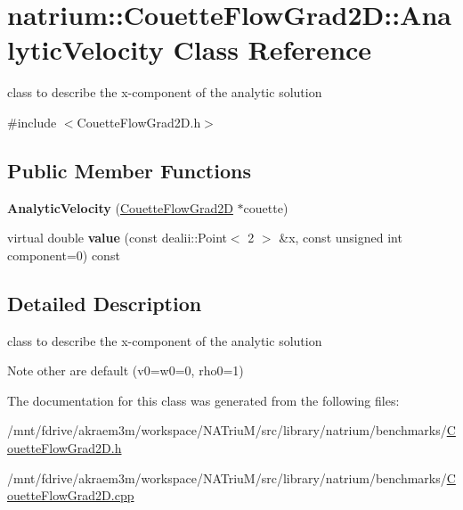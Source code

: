 \hypertarget{classnatrium_1_1CouetteFlowGrad2D_1_1AnalyticVelocity}{
\section{natrium::CouetteFlowGrad2D::AnalyticVelocity Class Reference}
\label{classnatrium_1_1CouetteFlowGrad2D_1_1AnalyticVelocity}
}


class to describe the x-\/component of the analytic solution  


{\ttfamily \#include $<$CouetteFlowGrad2D.h$>$}\subsection*{Public Member Functions}
\begin{DoxyCompactItemize}
\item 
\hypertarget{classnatrium_1_1CouetteFlowGrad2D_1_1AnalyticVelocity_a0000c1ae561e0cb83908149458239bc9}{
{\bfseries AnalyticVelocity} (\hyperlink{classnatrium_1_1CouetteFlowGrad2D}{CouetteFlowGrad2D} $\ast$couette)}
\label{classnatrium_1_1CouetteFlowGrad2D_1_1AnalyticVelocity_a0000c1ae561e0cb83908149458239bc9}

\item 
\hypertarget{classnatrium_1_1CouetteFlowGrad2D_1_1AnalyticVelocity_ae275beccc815763b2b998f474a7331da}{
virtual double {\bfseries value} (const dealii::Point$<$ 2 $>$ \&x, const unsigned int component=0) const }
\label{classnatrium_1_1CouetteFlowGrad2D_1_1AnalyticVelocity_ae275beccc815763b2b998f474a7331da}

\end{DoxyCompactItemize}


\subsection{Detailed Description}
class to describe the x-\/component of the analytic solution \begin{DoxyNote}{Note}
other are default (v0=w0=0, rho0=1) 
\end{DoxyNote}


The documentation for this class was generated from the following files:\begin{DoxyCompactItemize}
\item 
/mnt/fdrive/akraem3m/workspace/NATriuM/src/library/natrium/benchmarks/\hyperlink{CouetteFlowGrad2D_8h}{CouetteFlowGrad2D.h}\item 
/mnt/fdrive/akraem3m/workspace/NATriuM/src/library/natrium/benchmarks/\hyperlink{CouetteFlowGrad2D_8cpp}{CouetteFlowGrad2D.cpp}\end{DoxyCompactItemize}
